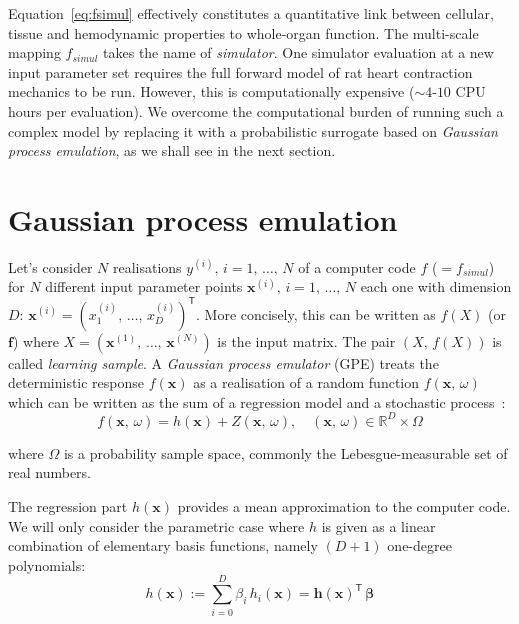 \noindent
Equation~\eqref{eq:fsimul} effectively constitutes a quantitative link between cellular, tissue and hemodynamic properties to whole-organ function. The multi-scale mapping $f_{simul}$ takes the name of \textit{simulator}. One simulator evaluation at a new input parameter set requires the full forward model of rat heart contraction mechanics to be run. However, this is computationally expensive ($\sim 4$-$10$ CPU hours per evaluation). We overcome the computational burden of running such a complex model by replacing it with a probabilistic surrogate based on \textit{Gaussian process emulation}, as we shall see in the next section.


%
%
%
\section{Gaussian process emulation}\label{sec:ch3gpe}
Let's consider $N$ realisations $y^{(i)},\,i=1,\,\dots,\,N$ of a computer code $f$ ($=f_{simul}$) for $N$ different input parameter points $\mathbf{x}^{(i)},\,i=1,\,\dots,\,N$ each one with dimension $D$: $\mathbf{x}^{(i)}=(x_{1}^{(i)},\,\dots,\,x_{D}^{(i)})^\mathsf{T}$. More concisely, this can be written as $f(X)$ (or $\mathbf{f}$) where $X=(\mathbf{x}^{(1)},\,\dots,\,\mathbf{x}^{(N)})$ is the input matrix. The pair $(X,\,f(X))$ is called \textit{learning sample}. A \textit{Gaussian process emulator} (\acs{GPE}) treats the deterministic response $f(\mathbf{x})$ as a realisation of a random function $f(\mathbf{x},\,\omega)$ which can be written as the sum of a regression model and a stochastic process~\cite{OHagan:2006}:
\begin{equation}
    f(\mathbf{x},\,\omega) = h(\mathbf{x}) + Z(\mathbf{x},\,\omega), \quad (\mathbf{x},\,\omega)\in\mathbb{R}^D\times\Omega
\end{equation}

\noindent
where $\Omega$ is a probability sample space, commonly the Lebesgue-measurable set of real numbers.

\vspace{0.2cm}
The regression part $h(\mathbf{x})$ provides a mean approximation to the computer code. We will only consider the parametric case where $h$ is given as a linear combination of elementary basis functions, namely $(D+1)$ one-degree polynomials:
%
\begin{equation}
    h(\mathbf{x}):=\sum_{i=0}^D\beta_i\,h_i(\mathbf{x}) = \mathbf{h}(\mathbf{x})^\mathsf{T}\,\boldsymbol{\beta}
\end{equation}

